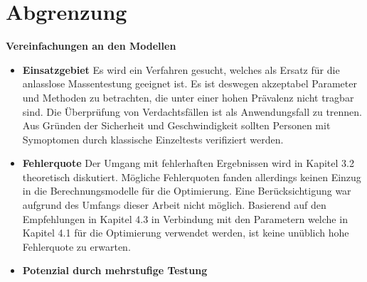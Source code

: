 \section{Abgrenzung}
\textbf{Vereinfachungen an den Modellen}
\begin{itemize}
	\item\textbf{Einsatzgebiet}
	Es wird ein Verfahren gesucht, welches als Ersatz für die anlasslose Massentestung geeignet ist.
	Es ist deswegen akzeptabel Parameter und Methoden zu betrachten, die unter einer hohen Prävalenz nicht tragbar sind.
	Die Überprüfung von Verdachtsfällen ist als Anwendungsfall zu trennen.
	Aus Gründen der Sicherheit und Geschwindigkeit sollten Personen mit Symoptomen durch klassische Einzeltests verifiziert werden.
	\item\textbf{Fehlerquote}\newline
	Der Umgang mit fehlerhaften Ergebnissen wird in Kapitel 3.2 theoretisch diskutiert.
	Mögliche Fehlerquoten fanden allerdings keinen Einzug in die Berechnungsmodelle für die Optimierung.
	Eine Berücksichtigung war aufgrund des Umfangs dieser Arbeit nicht möglich.
	Basierend auf den Empfehlungen in Kapitel 4.3 in Verbindung mit den Parametern welche in Kapitel 4.1 für die Optimierung verwendet werden, ist keine unüblich hohe Fehlerquote zu erwarten.
	\item\textbf{Potenzial durch mehrstufige Testung}
\end{itemize}





